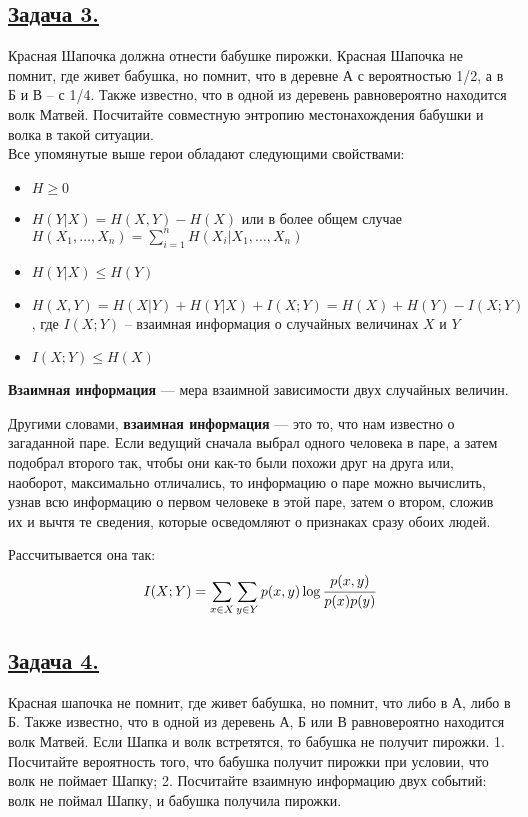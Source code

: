 \subsection*{\hyperref[sec:sol_problem3]{Задача 3.}}\label{sec:problem3} Красная Шапочка должна отнести бабушке пирожки. Красная Шапочка не помнит, где живет бабушка, но помнит, что в деревне А с вероятностью 1/2, а в Б и В – с 1/4. Также известно, что в одной из деревень равновероятно находится волк Матвей. Посчитайте совместную энтропию местонахождения бабушки и волка в такой ситуации.
\\ 

Все упомянутые выше герои обладают следующими свойствами:

\begin{itemize}
    \item $H \geqslant 0$
    \item $H(Y|X)=H(X, Y)-H(X)$ или в более общем случае $H(X_1, \ldots, X_n)=\sum\limits_{i=1}^n H(X_i|X_1, \ldots, X_n)$
    \item $H(Y|X)\leqslant H(Y)$
    \item $H(X, Y)=H(X|Y)+H(Y|X)+I(X; Y)=H(X)+H(Y)-I(X; Y)$, где $I(X; Y)$ -- взаимная информация о случайных величинах $X$ и $Y$
    \item $I(X; Y)\leqslant H(X)$
\end{itemize}

\begin{siderules}
    \textbf{Взаимная информация} --- мера взаимной зависимости двух случайных величин.
\end{siderules}

Другими словами, \textbf{взаимная информация} --- это то, что нам известно о загаданной паре. Если ведущий сначала выбрал одного человека в паре, а затем подобрал второго так, чтобы они как-то были похожи друг на друга или, наоборот, максимально отличались, то информацию о паре можно вычислить, узнав всю информацию о первом человеке в этой паре, затем о втором, сложив их и вычтя те сведения, которые осведомляют о признаках сразу обоих людей.

Рассчитывается она так:
\[I(X; Y)=\sum\limits_{x\in X}\sum\limits_{y\in Y} p(x, y)\log \cfrac{p(x, y)}{p(x)p(y)} \]

\subsection*{\hyperref[sec:sol_problem4]{Задача 4.}}\label{sec:problem4}  Красная шапочка не помнит, где живет бабушка, но помнит, что либо в А, либо в Б. Также известно, что в одной из деревень А, Б или В равновероятно находится волк Матвей. Если Шапка и волк встретятся, то бабушка не получит пирожки. 
1.	Посчитайте вероятность того, что бабушка получит пирожки при условии, что волк не поймает Шапку;
2.	Посчитайте взаимную информацию двух событий: волк не поймал Шапку, и бабушка получила пирожки.

